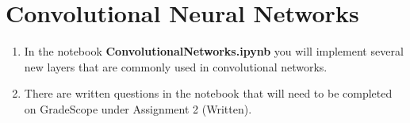 \section{Convolutional Neural Networks}

\begin{enumerate}
    \item {} In the notebook \textbf{ConvolutionalNetworks.ipynb} you will implement several new layers that are commonly used in convolutional networks.
    \item {} There are written questions in the notebook that will need to be completed on GradeScope under Assignment 2 (Written).
\end{enumerate}